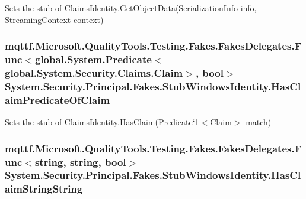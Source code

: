 Sets the stub of Claims\-Identity.\-Get\-Object\-Data(\-Serialization\-Info info, Streaming\-Context context)

\hypertarget{class_system_1_1_security_1_1_principal_1_1_fakes_1_1_stub_windows_identity_a3605e3642c9837937c79bf3673541276}{
\subsubsection[{Has\-Claim\-Predicate\-Of\-Claim}]{\setlength{\rightskip}{0pt plus 5cm}mqttf.\-Microsoft.\-Quality\-Tools.\-Testing.\-Fakes.\-Fakes\-Delegates.\-Func$<$global.\-System.\-Predicate$<$global.\-System.\-Security.\-Claims.\-Claim$>$, bool$>$ System.\-Security.\-Principal.\-Fakes.\-Stub\-Windows\-Identity.\-Has\-Claim\-Predicate\-Of\-Claim}}\label{class_system_1_1_security_1_1_principal_1_1_fakes_1_1_stub_windows_identity_a3605e3642c9837937c79bf3673541276}


Sets the stub of Claims\-Identity.\-Has\-Claim(Predicate`1$<$Claim$>$ match)

\hypertarget{class_system_1_1_security_1_1_principal_1_1_fakes_1_1_stub_windows_identity_a35ce7f9619782346d4bc3381b56c0764}{
\subsubsection[{Has\-Claim\-String\-String}]{\setlength{\rightskip}{0pt plus 5cm}mqttf.\-Microsoft.\-Quality\-Tools.\-Testing.\-Fakes.\-Fakes\-Delegates.\-Func$<$string, string, bool$>$ System.\-Security.\-Principal.\-Fakes.\-Stub\-Windows\-Identity.\-Has\-Claim\-String\-String}}\label{class_system_1_1_security_1_1_principal_1_1_fakes_1_1_stub_windows_identity_a35ce7f9619782346d4bc3381b56c0764}


